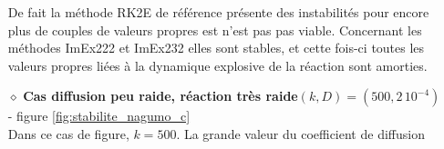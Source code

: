\begin{itemize}
                    De fait la méthode RK2E de référence présente des instabilités pour encore plus de couples de valeurs propres est n'est pas pas viable.
                    Concernant les méthodes ImEx222 et ImEx232 elles sont stables, et cette fois-ci toutes les valeurs propres liées à la 
                    dynamique explosive de la réaction sont amorties. 
                \item[$\diamond$]\textbf{Cas diffusion peu raide, réaction très raide$(k,D)=(500,2\, 10^{-4})$} - figure \ref{fig:stabilite_nagumo_c}\\
                    Dans ce cas de figure, $k=500$. La grande valeur du coefficient de diffusion 
            \end{itemize}
